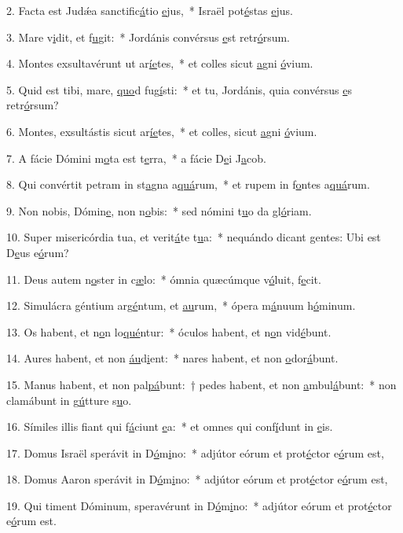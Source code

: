 2. Facta est Judǽa sanctific\uline{á}tio \uline{e}jus,~* Israël pot\uline{é}stas \uline{e}jus.\par 
3. Mare v\uline{i}dit, et f\uline{u}git:~* Jordánis convérsus \uline{e}st retr\uline{ó}rsum.\par 
4. Montes exsultavérunt ut ar\uline{í}\uline{e}tes,~* et colles sicut \uline{a}gni \uline{ó}vium.\par 
5. Quid est tibi, mare, \uline{quo}d fug\uline{í}sti:~* et tu, Jordánis, quia convérsus \uline{e}s retr\uline{ó}rsum?\par 
6. Montes, exsultástis sicut ar\uline{í}\uline{e}tes,~* et colles, sicut \uline{a}gni \uline{ó}vium.\par 
7. A fácie Dómini m\uline{o}ta est t\uline{e}rra,~* a fácie D\uline{e}i J\uline{a}cob.\par 
8. Qui convértit petram in st\uline{a}gna a\uline{quá}rum,~* et rupem in f\uline{o}ntes a\uline{quá}rum.\par 
9. Non nobis, Dómin\uline{e}, non n\uline{o}bis:~* sed nómini t\uline{u}o da gl\uline{ó}riam.\par 
10. Super misericórdia tua, et verit\uline{á}te t\uline{u}a:~* nequándo dicant gentes: Ubi est D\uline{e}us e\uline{ó}rum?\par 
11. Deus autem n\uline{o}ster in c\uline{æ}lo:~* ómnia quæcúmque v\uline{ó}luit, f\uline{e}cit.\par 
12. Simulácra géntium arg\uline{é}ntum, et \uline{au}rum,~* ópera m\uline{á}nuum h\uline{ó}minum.\par 
13. Os habent, et n\uline{o}n lo\uline{qué}ntur:~* óculos habent, et n\uline{o}n vid\uline{é}bunt.\par 
14. Aures habent, et non \uline{áu}d\uline{i}ent:~* nares habent, et non \uline{o}dor\uline{á}bunt.\par 
15. Manus habent, et non pal\uline{pá}bunt:~† pedes habent, et non \uline{a}mbul\uline{á}bunt:~* non clamábunt in g\uline{ú}tture s\uline{u}o.\par 
16. Símiles illis fiant qui f\uline{á}ciunt \uline{e}a:~* et omnes qui conf\uline{í}dunt in \uline{e}is.\par 
17. Domus Israël sperávit in D\uline{ó}m\uline{i}no:~* adjútor eórum et prot\uline{é}ctor e\uline{ó}rum est,\par 
18. Domus Aaron sperávit in D\uline{ó}m\uline{i}no:~* adjútor eórum et prot\uline{é}ctor e\uline{ó}rum est,\par 
19. Qui timent Dóminum, speravérunt in D\uline{ó}m\uline{i}no:~* adjútor eórum et prot\uline{é}ctor e\uline{ó}rum est.\par 
